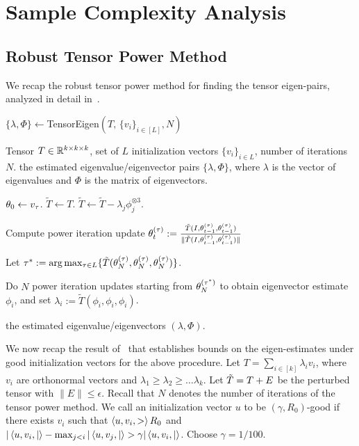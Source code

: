 \section{Sample Complexity Analysis}

\subsection{Robust Tensor Power Method}
We recap the robust tensor power method for finding the tensor eigen-pairs, analyzed in detail in~\cite{AnandkumarEtal:community12}.

\begin{algorithm}
\caption{$\{\lambda, \Phi\}\leftarrow $TensorEigen$(T,\, \{v_i\}_{i\in [L]}, N)$}\label{alg:robustpower}
\begin{algorithmic}
\renewcommand{\algorithmicrequire}{\textbf{Input: }}
\renewcommand{\algorithmicensure}{\textbf{Output: }}
\REQUIRE Tensor $T\in \mathbb{R}^{k \times k \times k}$, set of $L$ initialization vectors $\{v_i\}_{i\in L}$, number of
iterations  $N$.
\ENSURE the estimated eigenvalue/eigenvector pairs $\{\lambda, \Phi\}$, where $\lambda$ is the vector of eigenvalues and $\Phi$ is the matrix of eigenvectors.

\STATE $\theta_{0}\leftarrow v_\tau$.
\STATE $\tilde{T}\leftarrow T$.
\STATE $\tilde{T}\leftarrow \tilde{T}- \lambda_j \phi_j^{\otimes 3}$.
\ENDIF
\ENDFOR

\STATE Compute power iteration update
$
\theta_{t}^{(\tau)}  :=
\frac{\tilde{T}(I, \theta_{t-1}^{(\tau)}, \theta_{t-1}^{(\tau)})}
{\|\tilde{T}(I, \theta_{t-1}^{(\tau)}, \theta_{t-1}^{(\tau)})\|}
$\ENDFOR
\ENDFOR

\STATE Let $\tau^* := \arg\max_{\tau \in L} \{ \tilde{T}(\theta_{N}^{(\tau)},
\theta_{N}^{(\tau)}, \theta_{N}^{(\tau)}) \}$.

\STATE Do $N$ power iteration updates starting from
$\theta_{N}^{(\tau^*)}$ to obtain eigenvector estimate $\phi_i$, and set $\lambda_i :=
\tilde{T}(\phi_i, \phi_i, \phi_i)$.

\ENDFOR
\RETURN the estimated eigenvalue/eigenvectors
$(\lambda, \Phi)$.

\end{algorithmic}
\end{algorithm}


We now recap the result of~\cite[Thm. 13]{AnandkumarEtal:community12} that establishes bounds on the eigen-estimates under good initialization vectors for the above procedure. 
Let $T=\sum_{i\in [k]}\lambda_i v_i$, where $v_i$ are orthonormal vectors and $\lambda_1\geq \lambda_2\geq\ldots \lambda_k$. Let $\tilde{T}=T+E$ be the perturbed tensor with $\|E\|\leq \epsilon$. Recall that $N$ denotes the number of iterations of the tensor power method.
We call an initialization vector $u$ to be $(\gamma, R_0)$-good  if there exists $v_i$ such that $\left\langle u, v_i,> \right\rangle R_0$
  and $|\left\langle u, v_i,| \right\rangle -\max_{j<i} |\left\langle u,v_j,| \right\rangle > \gamma  |\left\langle u,v_i,| \right\rangle$.   Choose $\gamma=1/100$.


